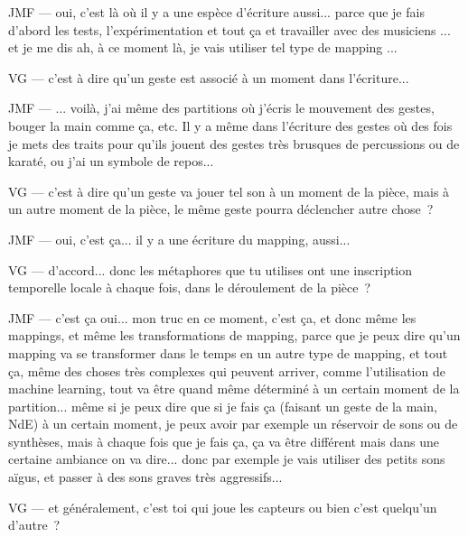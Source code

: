 JMF — oui, c'est là où il y a une espèce d'écriture aussi... parce que je fais d'abord les tests, l'expérimentation et tout ça et travailler avec des musiciens ... et je me dis ah, à ce moment là, je vais utiliser tel type de mapping ... 

VG — c'est à dire qu'un geste est associé à un moment dans l'écriture... 

JMF — ... voilà, j'ai même des partitions où j'écris le mouvement des gestes, bouger la main comme ça, etc. Il y a même dans l'écriture des gestes où des fois je mets des traits pour qu'ils jouent des gestes très brusques de percussions ou de karaté, ou j'ai un symbole de repos... 

VG — c'est à dire qu'un geste va jouer tel son à un moment de la pièce, mais à un autre moment de la pièce, le même geste pourra déclencher autre chose ? 

JMF — oui, c'est ça... il y a une écriture du mapping, aussi... 

VG — d'accord... donc les métaphores que tu utilises ont une inscription temporelle locale à chaque fois, dans le déroulement de la pièce ? 

JMF — c'est ça oui... mon truc en ce moment, c'est ça, et donc même les mappings, et même les transformations de mapping, parce que je peux dire qu'un mapping va se transformer dans le temps en un autre type de mapping, et tout ça, même des choses très complexes qui peuvent arriver, comme l'utilisation de machine learning, tout va être quand même déterminé à un certain moment de la partition... même si je peux dire que si je fais ça (faisant un geste de la main, NdE) à un certain moment, je peux avoir par exemple un réservoir de sons ou de synthèses, mais à chaque fois que je fais ça, ça va être différent mais dans une certaine ambiance on va dire... donc par exemple je vais utiliser des petits sons aïgus, et passer à des sons graves très aggressifs... 

VG — et généralement, c'est toi qui joue les capteurs ou bien c'est quelqu'un d'autre ? 

